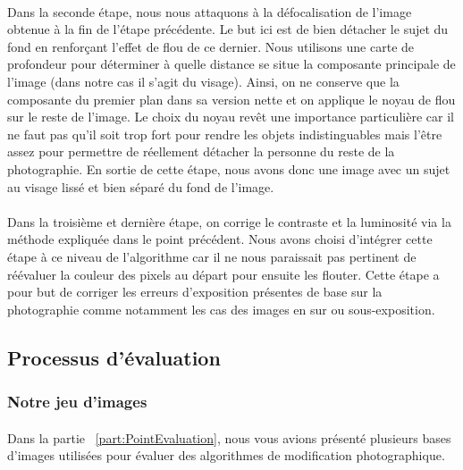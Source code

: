 \documentclass[11pt, french]{report-rd-info}
\begin{document}
\paragraph*{}
Dans la seconde étape, nous nous attaquons à la défocalisation de l'image obtenue à la fin de l'étape précédente. Le but ici est de bien détacher le sujet du fond en renforçant l'effet de flou de ce dernier.
Nous utilisons une carte de profondeur \cite{Zhuo2011} pour déterminer à quelle distance se situe la composante principale de l'image (dans notre cas il s'agit du visage).
Ainsi, on ne conserve que la composante du premier plan dans sa version nette et on applique le noyau de flou sur le reste de l'image.
Le choix du noyau revêt une importance particulière car il ne faut pas qu'il soit trop fort pour rendre les objets indistinguables mais l'être assez pour permettre de réellement détacher la personne du reste de la photographie.
En sortie de cette étape, nous avons donc une image avec un sujet au visage lissé et bien séparé du fond de l'image.
\paragraph*{}
Dans la troisième et dernière étape, on corrige le contraste et la luminosité via la méthode expliquée dans le point précédent. 
Nous avons choisi d'intégrer cette étape à ce niveau de l'algorithme car il ne nous paraissait pas pertinent de réévaluer la couleur des pixels au départ pour ensuite les flouter.
Cette étape a pour but de corriger les erreurs d'exposition présentes de base sur la photographie comme notamment les cas des images en sur ou sous-exposition. 

\subsection{Processus d'évaluation}
\label{part:evaluation}
\subsubsection{Notre jeu d'images}
\paragraph*{}
Dans la partie ~\ref{part:PointEvaluation}, nous vous avions présenté plusieurs bases d'images utilisées pour évaluer des algorithmes de modification photographique.
\end{document}
